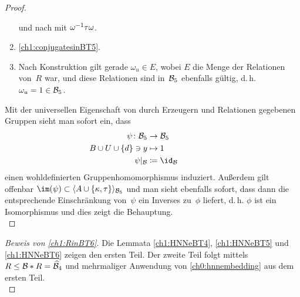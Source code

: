\begin{proof}
\begin{enumerate}[(1), itemsep=0pt, topsep=0.5\baselineskip]
            und nach  mit
            $\omega^{-1}\tau\omega$.
        \item
            \cref{ch1:conjugatesinBT5}.
        \item
            Nach Konstruktion gilt gerade $\omega_u\in E$, wobei
            $E$ die Menge der Relationen von~$R$ war, und diese Relationen
            sind in~$\mathcal{B}_5$ ebenfalls gültig, d.\,h. $\omega_u = 1\in\mathcal{B}_5$.
    \end{enumerate}
    Mit der universellen Eigenschaft von durch Erzeugern und Relationen
    gegebenen Gruppen sieht man sofort ein, dass
    \begin{align*}
        \psi\colon \BT_5 &\to \BT_5
        \\
        \mathllap{B\cup U\cup\{d\}} \ni y &\mapsto 1     \\
        \psi\vert_{\BT} &\defeq \id_{\BT}
    \end{align*}
    einen wohldefinierten Gruppenhomomorphismus induziert. Außerdem gilt
    offenbar $\im(\psi) \subset \Spann{A\cup\{\kappa,\tau\}}_{\BT_5}$
    und man sieht ebenfalls sofort, dass dann die entsprechende Einschränkung
    von~$\psi$ ein Inverses zu~$\phi$ liefert, d.\,h. $\phi$ ist ein
    Isomorphismus und dies zeigt die Behauptung.
    \\
\end{proof}

\begin{proof}[Beweis von \cref{ch1:RinBT6}]
    Die Lemmata \ref{ch1:HNNeBT4}, \ref{ch1:HNNeBT5} und
    \ref{ch1:HNNeBT6} zeigen den ersten Teil. Der zweite
    Teil folgt mittels $R\leq \mathcal{B} \mathbin{\ast} R = \widehat{\mathcal{B}}_4$ und
    mehrmaliger Anwendung von \cref{ch0:hnnembedding} aus
    dem ersten Teil.\\
\end{proof}

